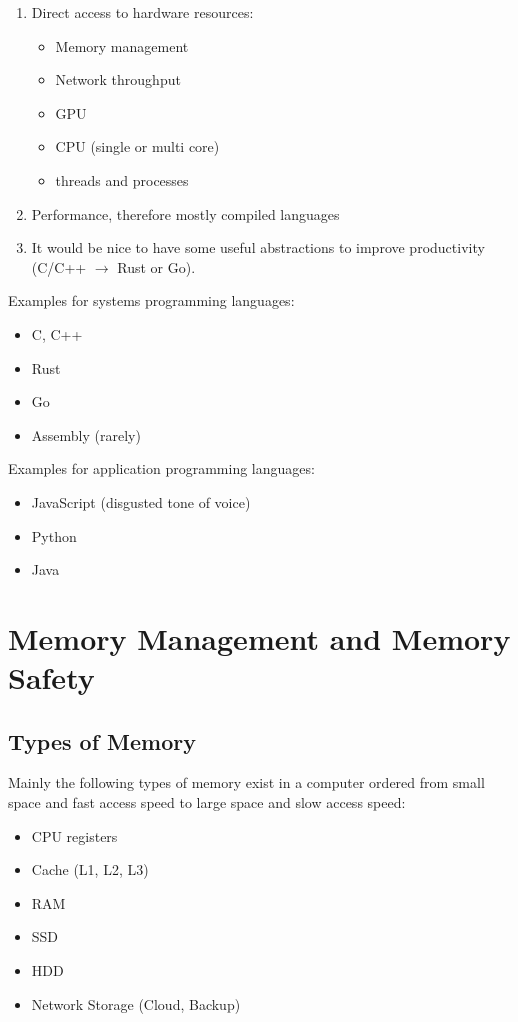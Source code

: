 \begin{enumerate}
    \item Direct access to hardware resources:
          \begin{itemize}
              \item Memory management
              \item Network throughput
              \item GPU
              \item CPU (single or multi core)
              \item threads and processes
          \end{itemize}
    \item Performance, therefore mostly compiled languages
    \item It would be nice to have some useful abstractions to improve productivity (C/C++ $\rightarrow$ Rust or Go).
\end{enumerate}

Examples for systems programming languages:

\begin{itemize}
    \item C, C++
    \item Rust
    \item Go
    \item Assembly (rarely)
\end{itemize}

Examples for application programming languages:

\begin{itemize}
    \item JavaScript (disgusted tone of voice)
    \item Python
    \item Java
\end{itemize}

\section{Memory Management and Memory Safety}

\subsection{Types of Memory}

Mainly the following types of memory exist in a computer ordered from small space and fast access speed to large space and slow access speed:

\begin{itemize}
    \item CPU registers
    \item Cache (L1, L2, L3)
    \item RAM
    \item SSD
    \item HDD
    \item Network Storage (Cloud, Backup)
\end{itemize}

